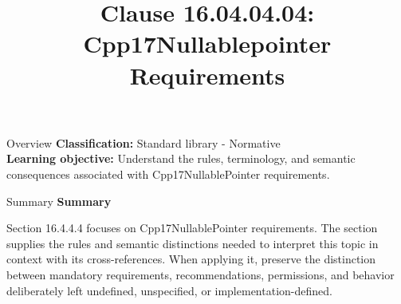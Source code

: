 \documentclass[10pt,letterpaper]{article}
\title{Clause 16.04.04.04: Cpp17Nullablepointer Requirements}
\author{}
\date{}
\begin{document}
\maketitle
\begin{CornellOverviewBox}{Overview}
\textbf{Classification:} Standard library - Normative\\[2pt]
\textbf{Learning objective:} Understand the rules, terminology, and semantic consequences associated with Cpp17NullablePointer requirements.
\end{CornellOverviewBox}\begin{CornellSummaryBox}{Summary}
{\sffamily\bfseries\color{Accent} Summary}\par\vspace{3pt}Section 16.4.4.4 focuses on Cpp17NullablePointer requirements. The section supplies the rules and semantic distinctions needed to interpret this topic in context with its cross-references. When applying it, preserve the distinction between mandatory requirements, recommendations, permissions, and behavior deliberately left undefined, unspecified, or implementation-defined.
\end{CornellSummaryBox}
\end{document}
